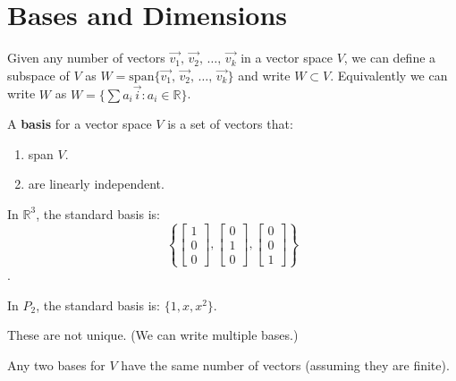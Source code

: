 \documentclass[../main.tex]{subfiles}
\begin{document}

\section{Bases and Dimensions}

Given any number of vectors \( \vec{v_1}, \, \vec{v_2}, \, \dots, \, \vec{v_k} \) in a vector space \( V \),
we can define a subspace of \( V \) as \( W = \text{span} \{ \vec{v_1}, \, \vec{v_2}, \, \dots, \, \vec{v_k} \} \)
and write \( W \subset V \).
Equivalently we can write \( W \) as \( W = \{\sum a_i \vec{i}: a_i \in \mathbb{R} \} \).

\begin{definition}[Basis]
    A \textbf{basis} for a vector space \( V \) is a set of vectors that:
    \begin{enumerate}
        \item span \( V \).
        \item are linearly independent.
    \end{enumerate}
\end{definition}

\begin{example}[]
    In \( \mathbb{R}^3 \), the standard basis is:
    \[ \left\{
        \begin{bmatrix} 1 \\ 0 \\ 0 \end{bmatrix},
        \begin{bmatrix} 0 \\ 1 \\ 0 \end{bmatrix},
        \begin{bmatrix} 0 \\ 0 \\ 1 \end{bmatrix}
    \right\} \].

    In \( P_2 \), the standard basis is: \( \{1,x,x^2\} \).
\end{example}

\begin{note}
    These are not unique. (We can write multiple bases.)
\end{note}

\begin{theorem}[]
    Any two bases for \( V \) have the same number of vectors (assuming they are finite).
\end{theorem}
\end{document}
